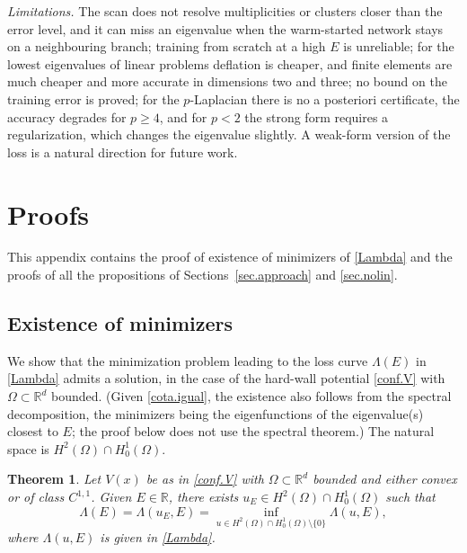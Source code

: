 \documentclass[10pt]{amsart}
\theoremstyle{definition}
\theoremstyle{remark}
\theoremstyle{plain}
\newtheorem{theorem}{Theorem}
\newcommand{\R}{\mathbb{R}}
\begin{document}
\emph{Limitations.} The scan does not resolve multiplicities or clusters closer than the error level,
and it can miss an eigenvalue when the warm-started network stays on a neighbouring branch; training
from scratch at a high $E$ is unreliable; for the lowest eigenvalues of linear problems deflation is
cheaper, and finite elements are much cheaper and more accurate in dimensions two and three; no bound
on the training error is proved; for the $p$-Laplacian there is no a posteriori certificate, the
accuracy degrades for $p\ge4$, and for $p<2$ the strong form requires a regularization, which changes
the eigenvalue slightly. A weak-form version of the loss is a natural direction for future work.

\clearpage
\appendix

\section{Proofs}\label{app.proofs}
This appendix contains the proof of existence of minimizers of \eqref{Lambda} and the proofs of all the propositions of Sections~\ref{sec.approach} and \ref{sec.nolin}.

\subsection{Existence of minimizers}
We show that the minimization problem leading to the loss curve $\Lambda(E)$ in \eqref{Lambda} admits
a solution, in the case of the hard-wall potential \eqref{conf.V} with $\Omega\subset \R^{d}$ bounded.
(Given \eqref{cota.igual}, the existence also follows from the spectral decomposition, the minimizers
being the eigenfunctions of the eigenvalue(s) closest to $E$; the proof below does not use the spectral
theorem.) The natural space is $H^2(\Omega) \cap H^1_0(\Omega)$.

\begin{theorem}\label{teo.min}
Let $V(x)$ be as in \eqref{conf.V} with $\Omega\subset \R^{d}$ bounded and either convex or of class $C^{1,1}$. Given $E\in\R$, there exists $u_E\in H^2(\Omega)\cap H^1_0(\Omega)$ such that
$$
\Lambda(E) = \Lambda(u_E, E) = \inf_{u\in H^2(\Omega)\cap H^1_0(\Omega)\setminus\{0\}}\Lambda(u, E),
$$
where $\Lambda(u, E)$ is given in \eqref{Lambda}.
\end{theorem}
\end{document}
